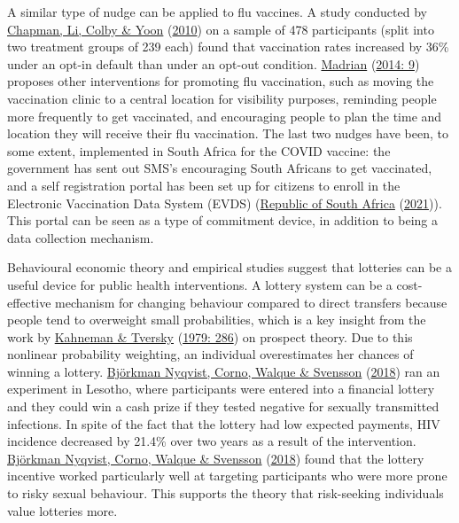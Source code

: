 \documentclass[11pt,preprint, authoryear]{elsarticle}
\numberwithin{equation}{section}
\numberwithin{figure}{section}
\numberwithin{table}{section}
\begin{document}
A similar type of nudge can be applied to flu vaccines. A study
conducted by \protect\hyperlink{ref-opt}{Chapman, Li, Colby \& Yoon}
(\protect\hyperlink{ref-opt}{2010}) on a sample of 478 participants
(split into two treatment groups of 239 each) found that vaccination
rates increased by 36\% under an opt-in default than under an opt-out
condition. \protect\hyperlink{ref-flu}{Madrian}
(\protect\hyperlink{ref-flu}{2014: 9}) proposes other interventions for
promoting flu vaccination, such as moving the vaccination clinic to a
central location for visibility purposes, reminding people more
frequently to get vaccinated, and encouraging people to plan the time
and location they will receive their flu vaccination. The last two
nudges have been, to some extent, implemented in South Africa for the
COVID vaccine: the government has sent out SMS's encouraging South
Africans to get vaccinated, and a self registration portal has been set
up for citizens to enroll in the Electronic Vaccination Data System
(EVDS) (\protect\hyperlink{ref-evds}{Republic of South Africa}
(\protect\hyperlink{ref-evds}{2021})). This portal can be seen as a type
of commitment device, in addition to being a data collection mechanism.

Behavioural economic theory and empirical studies suggest that lotteries
can be a useful device for public health interventions. A lottery system
can be a cost-effective mechanism for changing behaviour compared to
direct transfers because people tend to overweight small probabilities,
which is a key insight from the work by
\protect\hyperlink{ref-prospect}{Kahneman \& Tversky}
(\protect\hyperlink{ref-prospect}{1979: 286}) on prospect theory. Due to
this nonlinear probability weighting, an individual overestimates her
chances of winning a lottery. \protect\hyperlink{ref-hiv}{Björkman
Nyqvist, Corno, Walque \& Svensson} (\protect\hyperlink{ref-hiv}{2018})
ran an experiment in Lesotho, where participants were entered into a
financial lottery and they could win a cash prize if they tested
negative for sexually transmitted infections. In spite of the fact that
the lottery had low expected payments, HIV incidence decreased by 21.4\%
over two years as a result of the intervention.
\protect\hyperlink{ref-hiv}{Björkman Nyqvist, Corno, Walque \& Svensson}
(\protect\hyperlink{ref-hiv}{2018}) found that the lottery incentive
worked particularly well at targeting participants who were more prone
to risky sexual behaviour. This supports the theory that risk-seeking
individuals value lotteries more.
\end{document}
